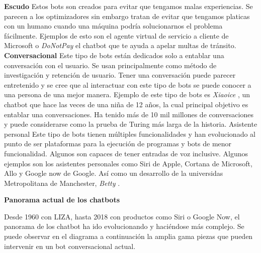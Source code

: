 \textbf{Escudo}
Estos bots son creados para evitar que tengamos malas experiencias. Se parecen a los optimizadores sin embargo tratan de evitar que tengamos platicas con un humano cuando una máquina podría solucionarnos el problema fácilmente. Ejemplos de esto son el agente virtual de servicio a cliente de Microsoft o \textit{DoNotPay} \cite{donotpay2017} el chatbot que te ayuda a apelar multas de tránsito.
\textbf{Conversacional}
Este tipo de bots están dedicados solo a entablar una conversación con el usuario. Se usan principalmente como método de investigación y retención de usuario. Tener una conversación puede parecer entretenido y se cree que al interactuar con este tipo de bots se puede conocer a una persona de una mejor manera. Ejemplo de este tipo de bots es \textit{Xiaoice} \cite{wiki:Xiaonic} , un chatbot que hace las veces de una niña de 12 años, la cual principal objetivo es entablar una conversaciones. Ha tenido más de 10 mil millones de conversaciones y puede considerarse como la prueba de Turing más larga de la historia.
Asistente personal
Este tipo de bots tienen múltiples funcionalidades y han evolucionado al punto de ser plataformas para la ejecución de programas y  bots de menor funcionalidad. Algunos son capaces de tener entradas de voz inclusive. Algunos ejemplos son los asistentes personales como Siri de Apple, Cortana de Microsoft, Allo y Google now de Google. Así como un desarrollo de la universidas Metropolitana de Manchester, \textit{Betty} \cite{curry2013betty}.


\textbf{Panorama actual de los chatbots}

 Desde 1960 con LIZA\cite{shawar2005using}, hasta 2018 con productos como Siri o Google Now, el panorama de los chatbot ha ido evolucionando y haciéndose más complejo. Se puede observar en el diagrama a continuación la amplia gama piezas que pueden intervenir en un bot conversacional actual.



